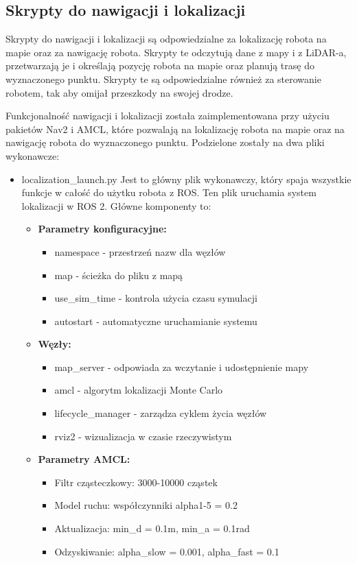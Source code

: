 \documentclass[a4paper,twoside,12pt]{book}
\begin{document}
\newpage
\subsection{Skrypty do nawigacji i lokalizacji}
Skrypty do nawigacji i lokalizacji są odpowiedzialne za lokalizację robota na mapie oraz za nawigację robota. Skrypty te odczytują dane z mapy i z LiDAR-a, przetwarzają je i określają pozycję robota na mapie oraz planują trasę do wyznaczonego punktu. Skrypty te są odpowiedzialne również za sterowanie robotem, tak aby omijał przeszkody na swojej drodze.

Funkcjonalność nawigacji i lokalizacji została zaimplementowana przy użyciu pakietów Nav2 i AMCL, które pozwalają na lokalizację robota na mapie oraz na nawigację robota do wyznaczonego punktu.
Podzielone zostały na dwa pliki wykonawcze:
\begin{itemize}
	\item localization\_launch.py
	Jest to główny plik wykonawczy, który spaja wszystkie funkcje w całość do użytku robota z ROS.
	Ten plik uruchamia system lokalizacji w ROS 2. Główne komponenty to:

	\begin{itemize}
	\item \textbf{Parametry konfiguracyjne:}
		\begin{itemize}
		\item namespace - przestrzeń nazw dla węzłów
		\item map - ścieżka do pliku z mapą
		\item use\_sim\_time - kontrola użycia czasu symulacji 
		\item autostart - automatyczne uruchamianie systemu
		\end{itemize}

	\item \textbf{Węzły:}
		\begin{itemize}
		\item map\_server - odpowiada za wczytanie i udostępnienie mapy
		\item amcl - algorytm lokalizacji Monte Carlo
		\item lifecycle\_manager - zarządza cyklem życia węzłów
		\item rviz2 - wizualizacja w czasie rzeczywistym
		\end{itemize}

	\item \textbf{Parametry AMCL:}
		\begin{itemize}
		\item Filtr cząsteczkowy: 3000-10000 cząstek
		\item Model ruchu: współczynniki alpha1-5 = 0.2
		\item Aktualizacja: min\_d = 0.1m, min\_a = 0.1rad
		\item Odzyskiwanie: alpha\_slow = 0.001, alpha\_fast = 0.1
		\end{itemize}


\end{itemize}
\end{itemize}
\end{document}
